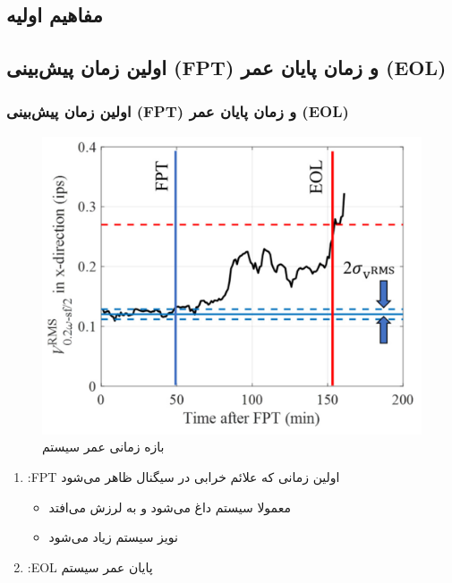 \documentclass[xcolor=dvipsnames, professionalfonts, aspectratio=169, 11pt]{beamer}
\begin{document}
\begin{persian}
\section{مفاهیم اولیه}

\subsection{اولین زمان پیش‌بینی (FPT) و زمان پایان عمر (EOL)}
\begin{frame}
	\frametitle{اولین زمان پیش‌بینی (FPT) و زمان پایان عمر (EOL)}
	
	
	\begin{multicols}{2}
		\begin{figure}
			\vspace{0em}
			\includegraphics[height=0.6\textheight]{img/img3.png}
			\caption{بازه زمانی عمر سیستم}
		\end{figure}
		
		\begin{enumerate}
			\item :FPT اولین زمانی که علائم خرابی در سیگنال ظاهر می‌شود
			\begin{itemize}
				\item معمولا سیستم داغ می‌شود و به لرزش می‌افتد
				\item نویز سیستم زیاد می‌شود
			\end{itemize}
			\item :EOL پایان عمر سیستم
		\end{enumerate}
		
		\pause
		

\end{multicols}
\end{frame}
\end{persian}
\end{document}
